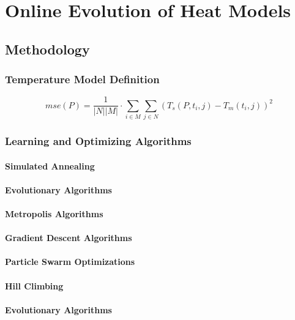 
\chapter{Online Evolution of Heat Models}
\label{ch:onlineevo}


\section{Methodology}
\subsection{Temperature Model Definition}

\begin{equation}
\label{eq:mse}
mse(P)=\frac{1}{|N||M|} \cdot \sum_{i\in M} \sum_{j\in N} (T_s(P,t_i,j)-T_m(t_i,j))^2
\end{equation}

\subsection{Learning and Optimizing Algorithms}
\subsubsection{Simulated Annealing}

\subsubsection{Evolutionary Algorithms}
\subsubsection{Metropolis Algorithms}

\subsubsection{Gradient Descent Algorithms}

\subsubsection{Particle Swarm Optimizations}

\subsubsection{Hill Climbing}
\subsubsection{Evolutionary Algorithms}